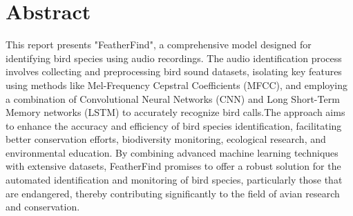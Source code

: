 \chapter*{Abstract}
This report presents "FeatherFind", a comprehensive model designed for
identifying bird species using audio recordings. The audio
identification process involves collecting and preprocessing bird sound
datasets, isolating key features using methods like Mel-Frequency Cepstral
Coefficients (MFCC), and employing a combination of Convolutional Neural
Networks (CNN) and Long Short-Term Memory networks (LSTM) to accurately
recognize bird calls.The approach aims to enhance the accuracy and
efficiency of bird species identification, facilitating better conservation
efforts, biodiversity monitoring, ecological research, and environmental
education. By combining advanced machine learning techniques with extensive
datasets, FeatherFind promises to offer a robust solution for the automated identification
and monitoring of bird species, particularly those that are endangered, thereby
contributing significantly to the field of avian research and conservation.


    {

        \KECadjusttocspacings %
        \makeatletter
        \def\@makeschapterhead#1{%
            {\newpage \parindent\z@ \raggedright\normalfont
                    \interlinepenalty\@M
                    \center\fontsize{16pt}{1} \bfseries
                    \MakeUppercase{#1}\par\nobreak
                    \vskip 18\p@ %
                }}
        \makeatother

        \tableofcontents %
        \listoffigures %
    }

